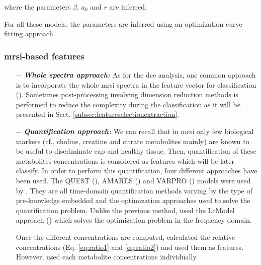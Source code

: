 \begin{enumerate}[leftmargin=*]
\noindent where the parameters $\beta$, $a_0$ and $r$ are inferred.

For all these models, the parameters are inferred using an optimization curve fitting approach.

\end{enumerate}

\subsubsection{\ac{mrsi}-based features}

\begin{enumerate}[leftmargin=*]

\item[$-$] \textbf{\textit{Whole spectra approach:}} As for the \ac{dce} analysis, one common approach is to incorporate the whole \ac{mrsi} spectra in the feature vector for classification (\cite{Kelm2007,Parfait2012,Tiwari2007,Tiwari2009,Tiwari2013,Tiwari2009a,Tiwari2010,Viswanath2008a,Matulewicz2013}). Sometimes post-processing involving dimension reduction methods is performed to reduce the complexity during the classification as it will be presented in Sect. \ref{subsec:featureselectionextraction}.

\item[$-$] \textbf{\textit{Quantification approach:}} We can recall that in \ac{mrsi} only few biological markers (cf., choline, creatine and citrate metabolites mainly) are known to be useful to discriminate \ac{cap} and healthy tissue. Then, quantification of these metabolites concentrations is considered as features which will be later classify. In order to perform this quantification, four different approaches have been used. The QUEST (\cite{Ratiney2005}), AMARES (\cite{Vanhamme1997}) and VARPRO (\cite{Coleman1993}) models were used by \cite{Kelm2007}. They are all time-domain quantification methods varying by the type of pre-knowledge embedded and the optimization approaches used to solve the quantification problem. Unlike the previous method, \cite{Parfait2012} used the LcModel approach (\cite{Provencher1993}) which solves the optimization problem in the frequency domain.

Once the different concentrations are computed, \cite{Kelm2007} calculated the relative concentrations (Eq. \eqref{eq:ratio1} and \eqref{eq:ratio2}) and used them as features. However, \cite{Parfait2012} used each metabolite concentrations individually.


\end{enumerate}
